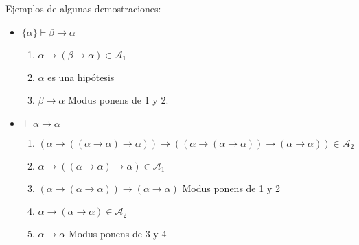 \begin{ejemplo}
    Ejemplos de algunas demostraciones:
    \begin{itemize}
        \item $\{\alpha\}\vdash \beta\to\alpha$
            \begin{enumerate}
                \item $\alpha\to(\beta\to\alpha)\in \mathcal{A}_1$
                \item $\alpha$ es una hipótesis
                \item $\beta\to\alpha$ Modus ponens de 1 y 2.
            \end{enumerate}
        \item $\vdash \alpha\to\alpha$
            \begin{enumerate}
                \item $(\alpha\to((\alpha\to\alpha)\to\alpha))\to((\alpha\to(\alpha\to\alpha))\to(\alpha\to\alpha))\in \mathcal{A}_2$
                \item $\alpha\to((\alpha\to\alpha)\to\alpha)\in \mathcal{A}_1$
                \item $(\alpha\to(\alpha\to\alpha))\to(\alpha\to\alpha)$ Modus ponens de 1 y 2
                \item $\alpha\to(\alpha\to\alpha)\in \mathcal{A}_2$
                \item $\alpha\to\alpha$ Modus ponens de 3 y 4
            \end{enumerate}
    \end{itemize}
\end{ejemplo}

